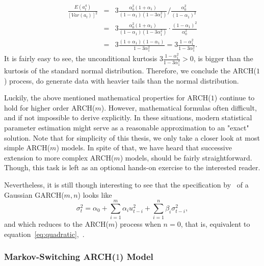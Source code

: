 \documentclass[a4paper,11pt,english]{article}
\begin{document}
			\begin{eqnarray*}
			\frac{E(a^4_t)}{\left[Var(a_t)\right]^2} &=& 3 \frac{\alpha_0^2(1+\alpha_1)}{(1-\alpha_1)(1 - 3\alpha^2_1)} / 
														 \frac{\alpha_0^2}{(1 - \alpha_1)^2} \\
			                                         &=& 3 \frac{\alpha_0^2(1+\alpha_1)}{(1-\alpha_1)(1 - 3\alpha^2_1)} \cdot 
			                                         \frac{(1 - \alpha_1)^2}{\alpha_0^2} \\
			                                         &=& 3 \frac{(1 + \alpha_1)(1 - \alpha_1)}{1 - 3\alpha^2_1} 
			                                         = 3 \frac{1 - \alpha_1^2}{1 - 3 \alpha^2_1}. 			
			\end{eqnarray*}
			It is fairly easy to see, the unconditional kurtosis $3 \frac{1 - \alpha_1^2}{1 - 3 \alpha^2_1} > 0$, is bigger than the kurtosis of the 	
			standard normal distribution. Therefore, we conclude the ARCH($1$) process, do generate data with heavier tails than the normal distribution. 
			
			Luckily, the above mentioned mathematical properties for ARCH($1$) continue to hold for higher order ARCH($m$). However, mathematical formulas 
			often difficult, and if not impossible to derive explicitly. In these situations, modern statistical parameter estimation might serve as a 
			reasonable approximation to an "exact" solution. Note that for simplicity of this thesis, we only take a closer look at most simple ARCH($m$) 
			models. In spite of that, we have heard that successive extension to more complex ARCH($m$) models, should be fairly straightforward. Though, 
			this task is left as an optional hands-on exercise to the interested reader. \vspace{0.3cm}
			
			Nevertheless, it is still though interesting to see that the specification by~\citep[p.~309]{bollerslev} of a Gaussian GARCH($m,n$) looks like   
			\begin{equation*}			
				\sigma_t^2 = \alpha_0 + \sum_{i=1}^{m}\alpha_i u^2_{t-i} + \sum_{i=1}^{n}\beta_i \sigma^2_{t-i},  
			\end{equation*}
			and which reduces to the ARCH($m$) process when $n=0$, that is, equivalent to equation~\ref{eq:quadratic},~\citep[p.~308]{hamiltonsusmel}.	
			

			
				\subsubsection{Markov-Switching ARCH($1$) Model}
			
\end{document}
